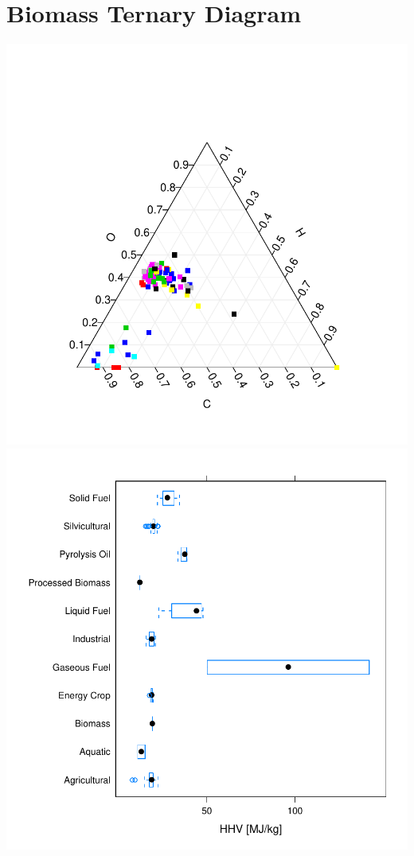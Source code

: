 \documentclass[a4paper]{article}
\begin{document}
\section{Biomass Ternary Diagram}
\includegraphics{documentation/images/img-003}
\\
\newpage
\includegraphics{documentation/images/img-004}
\end{document}
